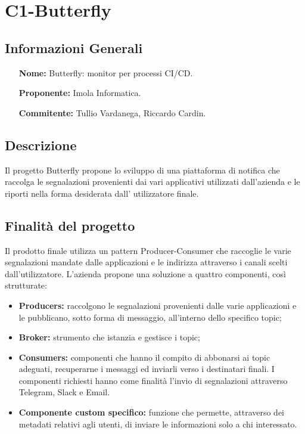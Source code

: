 \documentclass[a4paper, 11pt]{article}
\begin{document}
\section{C1-Butterfly} 
\subsection{Informazioni Generali}
\begin{itemize}
	\item[\bf Nome:] Butterfly: monitor per processi 	CI/CD.
	\item[\bf Proponente:]Imola Informatica.
	\item[\bf Commitente:]Tullio Vardanega, Riccardo 	Cardin.
\end{itemize}
\subsection{Descrizione}
Il progetto Butterfly propone lo sviluppo di una piattaforma di notifica che raccolga le segnalazioni provenienti dai vari applicativi utilizzati dall’azienda e le riporti nella forma desiderata dall’ utilizzatore finale. 
\subsection{Finalità del progetto}
Il prodotto finale utilizza un pattern Producer-Consumer che raccoglie le varie segnalazioni mandate dalle applicazioni e le indirizza attraverso i canali scelti dall’utilizzatore. L’azienda propone una soluzione a quattro componenti, così strutturate:
\begin{itemize}
\item \textbf {Producers:} raccolgono le segnalazioni provenienti dalle varie applicazioni e le pubblicano, sotto forma di messaggio, all’interno dello specifico topic;
\item \textbf {Broker:} strumento che istanzia e gestisce i topic;
\item \textbf {Consumers:} componenti che hanno il compito di abbonarsi ai topic adeguati, recuperarne i messaggi ed inviarli verso i destinatari finali. I componenti richiesti hanno come finalità l’invio di segnalazioni attraverso Telegram, Slack e Email.
\item \textbf {Componente custom specifico:} funzione che permette, attraverso dei metadati relativi agli utenti, di inviare le informazioni solo a chi interessato.
\end{itemize}
\end{document}
